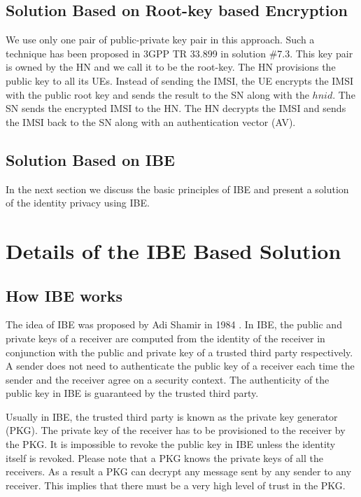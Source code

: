 \documentclass{river-journal}
\begin{document}
\subsection{Solution Based on Root-key based Encryption} 
\label{sub_sec:solution_root-key}
We use only one pair of public-private key pair in this approach. Such a technique has been proposed in 3GPP TR 33.899 in solution \#7.3. This key pair is owned by the HN and we call it to be the root-key. The HN provisions the public key to all its UEs.  Instead of sending the IMSI, the UE encrypts the IMSI with the public root key and sends the result to the SN along with the $hnid$. The SN sends the encrypted IMSI to the HN. The HN decrypts the IMSI and sends the IMSI back to the SN along with an authentication vector (AV).

\subsection{Solution Based on IBE}
In the next section we discuss the basic principles of IBE and present a solution of the identity privacy using IBE. 


\section{Details of the IBE Based Solution} 
\label{sec:solutions_based_on_IBE}
\subsection{How IBE works}
The idea of IBE was proposed by Adi Shamir in 1984 \cite{IBE_shamir}. In IBE, the public and private keys of a receiver are computed from the identity of the receiver in conjunction with the public and private key of a trusted third party respectively. A sender does not need to authenticate the public key of a receiver each time the sender and the receiver agree on a security context. The authenticity of the public key in IBE is guaranteed by the trusted third party. 

Usually in IBE, the trusted third party is known as the private key generator (PKG). The private key of the receiver has to be provisioned to the receiver by the PKG. It is impossible to revoke the public key in IBE unless the identity itself is revoked. Please note that a PKG knows the private keys of all the receivers. As a result a PKG can decrypt any message sent by any sender to any receiver. This implies that there must be a very high level of trust in the PKG.
\end{document}
